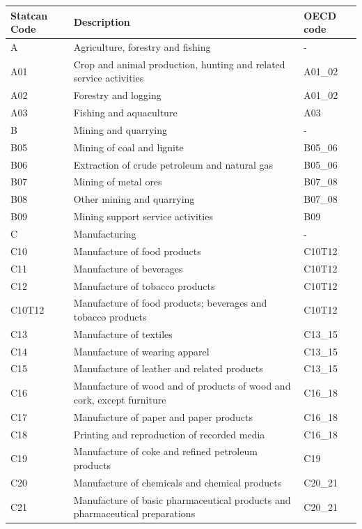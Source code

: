 \documentclass[12pt]{article}
\begin{document}
\small
{}
\begin{tabularx}{\textwidth}{l X l}
\hline
\textbf{Statcan Code} & \textbf{Description} & \textbf{OECD code} \\
\hline
\hline
A       & Agriculture, forestry and fishing & - \\
A01     & Crop and animal production, hunting and related service activities & A01\_02 \\
A02     & Forestry and logging & A01\_02 \\
A03     & Fishing and aquaculture & A03 \\
B       & Mining and quarrying & - \\
B05     & Mining of coal and lignite & B05\_06 \\
B06     & Extraction of crude petroleum and natural gas & B05\_06 \\
B07     & Mining of metal ores & B07\_08 \\
B08     & Other mining and quarrying & B07\_08 \\
B09     & Mining support service activities & B09 \\
C       & Manufacturing & - \\
C10     & Manufacture of food products & C10T12 \\
C11     & Manufacture of beverages & C10T12 \\
C12     & Manufacture of tobacco products & C10T12 \\
C10T12  & Manufacture of food products; beverages and tobacco products & C10T12 \\
C13     & Manufacture of textiles & C13\_15 \\
C14     & Manufacture of wearing apparel & C13\_15 \\
C15     & Manufacture of leather and related products & C13\_15 \\
C16     & Manufacture of wood and of products of wood and cork, except furniture & C16\_18 \\
C17     & Manufacture of paper and paper products & C16\_18 \\
C18     & Printing and reproduction of recorded media & C16\_18 \\
C19     & Manufacture of coke and refined petroleum products & C19 \\
C20     & Manufacture of chemicals and chemical products & C20\_21 \\
C21     & Manufacture of basic pharmaceutical products and pharmaceutical preparations & C20\_21 \\

\end{tabularx}
\end{document}
